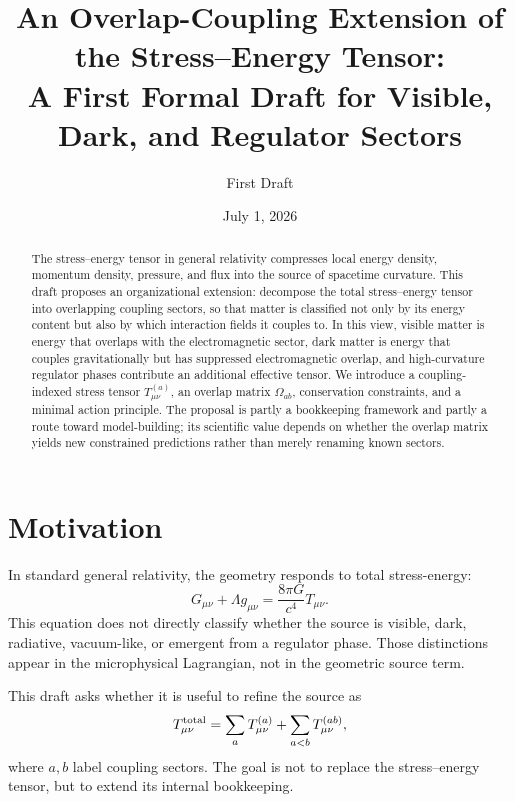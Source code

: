 \documentclass[11pt]{article}
\title{An Overlap-Coupling Extension of the Stress--Energy Tensor:\\A First Formal Draft for Visible, Dark, and Regulator Sectors}
\author{First Draft}
\date{July 1, 2026}
\theoremstyle{remark}
\begin{document}
\maketitle

\begin{abstract}
The stress--energy tensor in general relativity compresses local energy density, momentum density, pressure, and flux into the source of spacetime curvature. This draft proposes an organizational extension: decompose the total stress--energy tensor into overlapping coupling sectors, so that matter is classified not only by its energy content but also by which interaction fields it couples to. In this view, visible matter is energy that overlaps with the electromagnetic sector, dark matter is energy that couples gravitationally but has suppressed electromagnetic overlap, and high-curvature regulator phases contribute an additional effective tensor. We introduce a coupling-indexed stress tensor $T^{(a)}_{\mu\nu}$, an overlap matrix $\Omega_{ab}$, conservation constraints, and a minimal action principle. The proposal is partly a bookkeeping framework and partly a route toward model-building; its scientific value depends on whether the overlap matrix yields new constrained predictions rather than merely renaming known sectors.
\end{abstract}

\section{Motivation}
In standard general relativity, the geometry responds to total stress-energy:
\begin{equation}
    G_{\mu\nu}+\Lambda g_{\mu\nu}=\frac{8\pi G}{c^4}T_{\mu\nu}.
\end{equation}
This equation does not directly classify whether the source is visible, dark, radiative, vacuum-like, or emergent from a regulator phase. Those distinctions appear in the microphysical Lagrangian, not in the geometric source term.

This draft asks whether it is useful to refine the source as
\begin{equation}
    T_{\mu\nu}^{\rm total}
    =\sum_a T^{(a)}_{\mu\nu}
    +\sum_{a<b}T^{(ab)}_{\mu\nu},
    \label{eq:decomp}
\end{equation}
where $a,b$ label coupling sectors. The goal is not to replace the stress--energy tensor, but to extend its internal bookkeeping.
\end{document}
